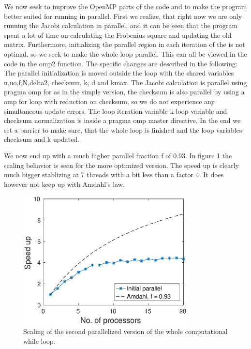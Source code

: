 We now seek to improve the OpenMP parts of the code and to make the program better suited for running in parallel. First we realize, that right now we are only running the Jacobi calculation in parallel, and it can be seen that the program spent a lot of time on calculating the Frobenius square and updating the old matrix. Furthermore, initializing the parallel region in each iteration of the is not optimal, so we seek to make the whole loop parallel. This can all be viewed in the code in the omp2 function. The specific changes are described in the following: The parallel initialization is moved outside the loop with the shared variables u,uo,f,N,delta2, checksum, k, d and kmax. The Jacobi calculation is parallel using pragma omp for as in the simple version, the checksum is also parallel by using a omp for loop with reduction on checksum, so we do not experience any simultaneous update errors. The loop iteration variable k loop variable and checksum normalization is inside a pragma omp master directive. In the end we set a barrier to make sure, that the whole loop is finished and the loop variables checksum and k updated.


					
					

We now end up with a much higher parallel fraction f of 0.93. In figure \ref{fig:omp2_scale} the scaling behavior is seen for the more optimized version. The speed up is clearly much bigger stablizing at 7 threads with a bit less than a factor 4. It does however not keep up with Amdahl's law.

\begin{figure}[h!]
\centering
\includegraphics[width = 0.8\textwidth]{fig/speedup_omp2.eps}
\caption{Scaling of the second parallelized version of the whole computational while loop.}
\label{fig:omp2_scale}
\end{figure}

